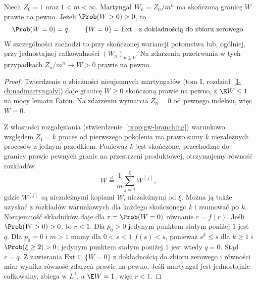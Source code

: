 \begin{twierdzenie}
\label{thm:gw-limit-extinction}
Niech $Z_0=1$ oraz $1<m<\infty$.
Martyngał $W_n=Z_n/m^n$ ma skończoną granicę
$W$ prawie na pewno. Jeżeli $\Prob(W>0)>0$, to
\[
\Prob(W=0)=q,\qquad
\{W=0\}=\mathrm{Ext}\quad\text{z dokładnością do zbioru zerowego}.
\]
W szczególności zachodzi to przy skończonej wariancji
potomstwa lub, ogólniej, przy jednostajnej całkowalności
$(W_n)_{n\ge0}$. Na zdarzeniu przetrwania w tych
przypadkach $Z_n/m^n\to W>0$ prawie na pewno.
\end{twierdzenie}
\begin{proof}
Twierdzenie o zbieżności nieujemnych martyngałów
(tom I, rozdział~\ref{I-ch:nadmartyngaly}) daje granicę $W\ge0$ skończoną prawie na pewno,
z $\E W\le1$ na mocy lematu Fatou.
Na zdarzeniu wymarcia $Z_n=0$ od pewnego indeksu,
więc $W=0$.

Z własności rozgałęziania
(stwierdzenie~\ref{prop:gw-branching}) warunkowo
względem $Z_1=k$ proces od pierwszego pokolenia
ma prawo sumy $k$ niezależnych procesów z jednym
przodkiem. Ponieważ $k$ jest skończone, przechodząc
do granicy prawie pewnych granic na przestrzeni
produktowej, otrzymujemy równość rozkładów
\[
W\overset{d}=\frac1m\sum_{j=1}^{\xi} W^{(j)},
\]
gdzie $W^{(j)}$ są niezależnymi kopiami $W$,
niezależnymi od $\xi$. Można ją także uzyskać
z rozkładów warunkowych dla każdego skończonego $k$
i zsumować po $k$.
Nieujemność składników daje dla $r=\Prob(W=0)$
równanie $r=f(r)$. Jeśli $\Prob(W>0)>0$, to $r<1$.
Dla $p_0>0$ jedynym punktem stałym poniżej $1$
jest $q$. Dla $p_0=0$ i $m>1$ mamy dla $0<s<1$
$f(s)<s$, ponieważ $s^k\le s$ dla $k\ge1$
i $\Prob(\xi\ge2)>0$; jedynym punktem stałym
poniżej $1$ jest wtedy $q=0$.
Stąd $r=q$. Z zawierania $\mathrm{Ext}\subseteq\{W=0\}$
z dokładnością do zbioru zerowego i równości miar
wynika równość zdarzeń prawie na pewno.
Jeśli martyngał jest jednostajnie całkowalny,
zbiega w $L^1$, a $\E W=1$, więc $r<1$.
\end{proof}

